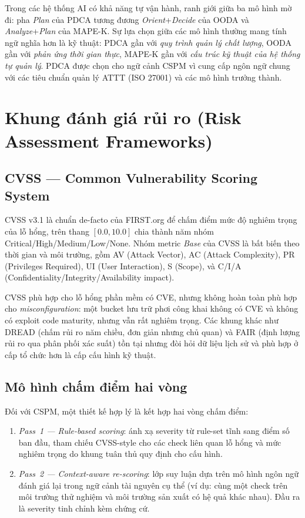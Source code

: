 Trong các hệ thống AI có khả năng tự vận hành, ranh giới giữa ba mô hình mờ đi: pha \textit{Plan} của PDCA tương đương \textit{Orient}+\textit{Decide} của OODA và \textit{Analyze}+\textit{Plan} của MAPE-K. Sự lựa chọn giữa các mô hình thường mang tính ngữ nghĩa hơn là kỹ thuật: PDCA gần với \textit{quy trình quản lý chất lượng}, OODA gần với \textit{phản ứng thời gian thực}, MAPE-K gần với \textit{cấu trúc kỹ thuật của hệ thống tự quản lý}. PDCA được chọn cho ngữ cảnh CSPM vì cung cấp ngôn ngữ chung với các tiêu chuẩn quản lý ATTT (ISO 27001) và các mô hình trưởng thành.

\section{Khung đánh giá rủi ro (Risk Assessment Frameworks)}
\label{sec:risk}

\subsection{CVSS --- Common Vulnerability Scoring System}
\label{subsec:cvss}

CVSS v3.1 \cite{cvss_v3_1} là chuẩn de-facto của FIRST.org để chấm điểm mức độ nghiêm trọng của lỗ hổng, trên thang $[0.0, 10.0]$ chia thành năm nhóm Critical/High/Medium/Low/None. Nhóm metric \textit{Base} của CVSS là bất biến theo thời gian và môi trường, gồm AV (Attack Vector), AC (Attack Complexity), PR (Privileges Required), UI (User Interaction), S (Scope), và C/I/A (Confidentiality/Integrity/Availability impact).

CVSS phù hợp cho lỗ hổng phần mềm có CVE, nhưng không hoàn toàn phù hợp cho \textit{misconfiguration}: một bucket lưu trữ phơi công khai không có CVE và không có exploit code maturity, nhưng vẫn rất nghiêm trọng. Các khung khác như DREAD \cite{howard_leblanc_2003} (chấm rủi ro năm chiều, đơn giản nhưng chủ quan) và FAIR \cite{fair_jones_2005} (định lượng rủi ro qua phân phối xác suất) tồn tại nhưng đòi hỏi dữ liệu lịch sử và phù hợp ở cấp tổ chức hơn là cấp cấu hình kỹ thuật.

\subsection{Mô hình chấm điểm hai vòng}
\label{subsec:two-pass-risk}

Đối với CSPM, một thiết kế hợp lý là kết hợp hai vòng chấm điểm:
\begin{enumerate}
  \item \textit{Pass~1 --- Rule-based scoring}: ánh xạ severity từ rule-set tĩnh sang điểm số ban đầu, tham chiếu CVSS-style cho các check liên quan lỗ hổng và mức nghiêm trọng do khung tuân thủ quy định cho cấu hình.
  \item \textit{Pass~2 --- Context-aware re-scoring}: lớp suy luận dựa trên mô hình ngôn ngữ đánh giá lại trong ngữ cảnh tài nguyên cụ thể (ví dụ: cùng một check trên môi trường thử nghiệm và môi trường sản xuất có hệ quả khác nhau). Đầu ra là severity tinh chỉnh kèm chứng cứ.
\end{enumerate}

